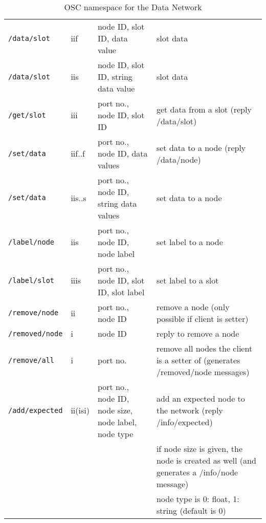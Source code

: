 \documentclass[letterpaper,10pt]{article}
\begin{document}
\begin{sidewaystable}[!tbp]
\begin{center}
\begin{tabular}{|llll|}
\verb|/data/slot| & iif & node ID, slot ID, data value & slot data \\
\verb|/data/slot| & iis & node ID, slot ID, string data value & slot data \\
\verb|/get/slot| & iii & port no., node ID, slot ID & get data from a slot (reply /data/slot) \\

\verb|/set/data| & iif..f & port no., node ID, data values & set data to a node (reply /data/node)\\
\verb|/set/data| & iis..s & port no., node ID, string data values & set data to a node\\

\verb|/label/node| & iis & port no., node ID, node label & set label to a node \\
\verb|/label/slot| & iiis & port no., node ID, slot ID, slot label & set label to a slot \\

\verb|/remove/node| & ii & port no., node ID & remove a node (only possible if client is setter) \\
\verb|/removed/node| & i & node ID & reply to remove a node \\
\verb|/remove/all| & i & port no. & remove all nodes the client is a setter of (generates /removed/node messages) \\

\verb|/add/expected| & ii(isi) & port no., node ID, node size, node label, node type & add an expected node to the network (reply /info/expected) \\
 &  &  & if node size is given, the node is created as well (and generates a /info/node message) \\
 &  &  & node type is 0: float, 1: string (default is 0) \\
\hline
\end{tabular}
\end{center}
\caption{OSC namespace for the Data Network}
\label{oscinterface}
\end{sidewaystable}
\end{document}
